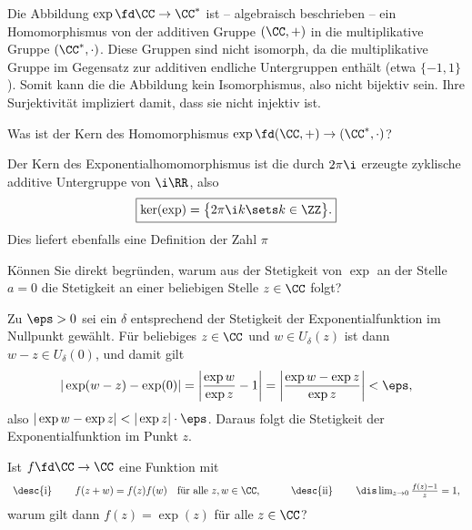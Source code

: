 \begin{antwort}
  Die Abbildung $\exp \fd \CC \to \CC^*$ ist -- 
  algebraisch beschrieben -- 
  ein Homomorphismus von der additiven Gruppe $(\CC, +)$ in die 
  multiplikative Gruppe $( \CC^*, \cdot)$. 
  Diese Gruppen sind nicht isomorph, da die multiplikative 
  Gruppe im Gegensatz zur additiven endliche Untergruppen enthält 
  (etwa $\{-1,1\}$). Somit kann die 
  die Abbildung kein Isomorphismus, also nicht bijektiv sein. 
  Ihre Surjektivität impliziert damit, dass sie 
  nicht injektiv ist. 
  \AntEnd
\end{antwort}

\begin{frage}\label{05_kern}
  Was ist der Kern des Homomorphismus $\exp\fd(\CC,+)\to(\CC^*,\cdot)$?
\end{frage}

\begin{antwort}
  Der Kern des Exponentialhomomorphismus 
  ist die durch $2\pi \i$ erzeugte 
  zyklische additive Untergruppe von $\i \RR$, also 
  \[
  \boxed{
    \ker(\exp)=\big\{ 2 \pi \i k \sets k\in \ZZ \big\}.
  }
  \]
  Dies liefert ebenfalls eine Definition der Zahl $\pi$ 
  \AntEnd  
\end{antwort} 

\begin{frage}
  Können Sie direkt begründen, warum aus der Stetigkeit von $\exp$ an der 
  Stelle $a=0$ die Stetigkeit an einer beliebigen Stelle $z\in\CC$ folgt?
\end{frage}

\begin{antwort}
  Zu $\eps>0$ sei ein $\delta$ entsprechend der Stetigkeit der 
  Exponentialfunktion im Nullpunkt gewählt. Für beliebiges 
  $z\in \CC$ und $w\in U_\delta( z )$ ist dann 
  $w-z \in U_{\delta}(0)$, und damit gilt  
  \[
  |\exp( w-z ) - \exp(0) | = 
  \left| \frac{\exp w}{\exp z} -1 \right| = 
  \left| \frac{\exp w - \exp z}{\exp z} \right| < \eps,
  \]
  also $|\exp w - \exp z | <  |\exp z| \cdot \eps$. 
  Daraus folgt die Stetigkeit der Exponentialfunktion im Punkt $z$.
  \AntEnd
\end{antwort}

\begin{frage}
  Ist $f\fd \CC\to\CC$ eine Funktion mit
  \[
  \begin{array}{lp{1mm}lp{4mm}lp{1mm}l}
    \text{\desc{i}} & & f(z+w)=f(z)f(w)\quad\text{für alle $z,w\in\CC$,} & &
    \text{\desc{ii}} & & \dis \lim_{z\to 0} \frac{f(z)-1}{z}=1,
  \end{array}
  \]
  warum gilt dann $f(z)=\exp(z)$ für alle $z\in\CC$?
\end{frage}

